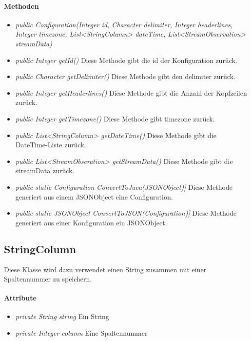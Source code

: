\paragraph{Methoden}
\begin{itemize}
	\item \textit{public Configuration(Integer id, Character delimiter, Integer headerlines, Integer timezone, List<StringColumn> dateTime, List<StreamObservation> streamData)}
	
	\item \textit{public Integer getId()} Diese Methode gibt die id der Konfiguration zurück.
	
	\item \textit{public Character getDelimiter()} Diese Methode gibt den delimiter zurück.
	
	\item \textit{public Integer getHeaderlines()} Diese Methode gibt die Anzahl der Kopfzeilen zurück.
	
	\item \textit{public Integer getTimezone()} Diese Methode gibt timezone zurück.	
	
	\item \textit{public List<StringColumn> getDateTime()} Diese Methode gibt die DateTime-Liste zurück.
	
	\item \textit{public List<StreamObseration> getStreamData()} Diese Methode gibt die streamData zurück.

	\item \textit{public static Configuration ConvertToJava(JSONObject)]} Diese Methode generiert aus einem JSONObject eine Configuration.
	
	\item \textit{public static JSONObject ConvertToJSON(Configuration)]} Diese Methode generiert aus einer Konfiguration ein JSONObject.
\end{itemize}


\subsection{StringColumn}
Diese Klasse wird dazu verwendet einen String zusammen mit einer Spaltennummer zu speichern.
\paragraph{Attribute}
\begin{itemize}
	\item \textit{private String string} Ein String
	\item \textit{private Integer column} Eine Spaltennummer
\end{itemize} 

